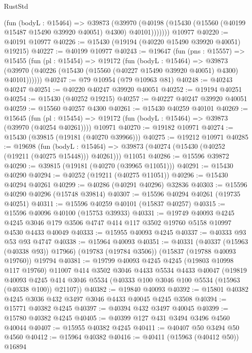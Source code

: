 \begin{lexlean}{RustStd}
\begin{coremodule}
          (fun (bodyL : @15464) =>
          @39873
            (@39970
              (@40198 (@15430 (@15560 (@40199 @15487 @15490 @39920 @40051) @4300) @40101)))))))
    @10977
@40220 := @40191 @10977
@40226 := @15430 (@19194 (@40220 @15490 @39920 @40051) @19215)
@40227 := @40199 @10977
@40243 := @19647
    (fun (pns : @15557) =>
    @15455
      (fun (pl : @15454) =>
      @19172
        (fun (bodyL : @15464) =>
        @39873 (@39970 (@40226 (@15430 (@15560 (@40227 @15490 @39920 @40051) @4300) @40101))))))
@40247 := @79 @10954 (@79 @10963 @81)
@40248 := @40243 @40247
@40251 := @40220 @40247 @39920 @40051
@40252 := @19194 @40251
@40254 := @15430 (@40252 @19215)
@40257 := @40227 @40247 @39920 @40051
@40259 := @15560 @40257 @4300
@40261 := @15430 @40259 @40101
@40269 := @15645
    (fun (pl : @15454) => @19172 (fun (bodyL : @15464) => @39873 (@39970 (@40254 @40261))))
    @10971
@40270 := @19182 @10971
@40274 := @15430 (@39815 (@19181 (@40270 @39966)))
@40275 := @19212 @10971
@40285 := @19698
    (fun (bodyL : @15464) => @39873 (@40274 (@15430 (@40252 (@19211 (@40275 @15448))) @40261)))
    @11051
@40286 := @15596 @39872
@40290 := @39815 (@19181 (@40270 (@39965 @11051)))
@40291 := @15430 @40290
@40294 := @40252 (@19211 (@40275 @11051))
@40296 := @15430 @40294 @40261
@40299 := @40286 (@40291 @40296) @32836
@40303 := @15596 @40290 @40296 (@15748 @39814)
@40307 := @15596 @40294 @40261 (@19735 @40251)
@40311 := @15596 @40259 @40101 (@15837 @40257)
@40315 := @15596 @40096 @40100 (@15753 @39933)
@40331 := @19749
    @40093
    @4245
    @4245
    @3046
    @179
    @3506
    @4747
    @414
    @117
    @3502
    @19760
    @5158
    @10997
    @4530
    @4433
    @40049
@40333 := @15955 @40093 @4245
@40337 := @40333 @93 @53 @93 @4747
@40338 := @15964 @40093
@40351 := @40331
    (@40337 (@15963 (@40338 @93)) @17966)
    (@19783 (@19784 @3506))
    (@15837 (@19788 @40093 @19760))
    @19794
@40381 := @19799
    @40093
    @4245
    @4245
    (@19803 @10998 @117 @19760)
    @11007
    @414
    @3502
    @3046
    @4433
    @5534
    @4433
    @40047
    (@19819
      @40093
      @4245
      @414
      @3046
      @5534
      (@40333 @100 @3046 @100 @5534 (@15963 (@40338 @100)) @21107))
@40382 := @19840 @40093
@40392 := @15801 @40382 @4245 @3036 @432 @3497 @3046 @4433 @40045 @4245 @3508
@40394 := @15771 @40382 @4245
@40397 := @40394 @432 @3497 @40045
@40399 := @15780 @40382 @4245
@40405 := @40399 @127 @431 @3494 @3496 @4560 @40044
@40407 := @15955 @40382 @4245
@40411 := @40407 @50 @3494 @50 @4560
@40412 := @15964 @40382
@40416 := @40411 (@15963 (@40412 @50)) @16894

\end{coremodule}
\end{lexlean}
